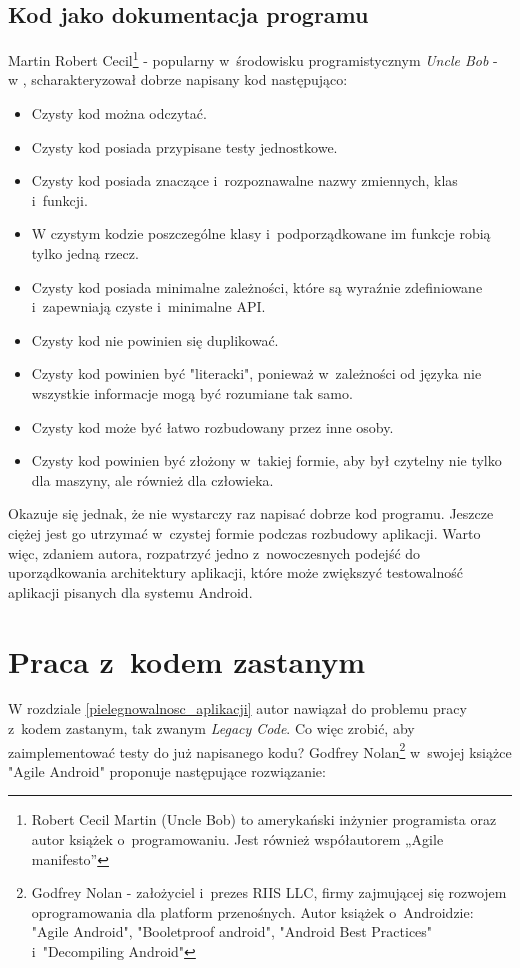 \subsection{Kod jako dokumentacja programu}
\label{czysty_kod}
Martin Robert Cecil\footnote{Robert Cecil Martin (Uncle Bob) to amerykański inżynier programista oraz autor książek o~programowaniu. Jest również współautorem „Agile manifesto”} - popularny w~środowisku programistycznym \textit{Uncle Bob} - w \cite{bib:cecil:clean_code}, scharakteryzował dobrze napisany kod następująco: 
\begin{itemize}
\item
Czysty kod można odczytać.
\item
Czysty kod posiada przypisane testy jednostkowe.
\item
Czysty kod posiada znaczące i~rozpoznawalne nazwy zmiennych, klas i~funkcji.
\item
W czystym kodzie poszczególne klasy i~podporządkowane im funkcje robią tylko jedną rzecz.
\item
Czysty kod posiada minimalne zależności, które są wyraźnie zdefiniowane i~zapewniają czyste i~minimalne API.
\item
Czysty kod nie powinien się duplikować.
\item
Czysty kod powinien być "literacki", ponieważ w~zależności od języka nie wszystkie informacje mogą być rozumiane tak samo.
\item
Czysty kod może być łatwo rozbudowany przez inne osoby.
\item
Czysty kod powinien być złożony w~takiej formie, aby był czytelny nie tylko dla maszyny, ale również dla człowieka.
\end{itemize}
Okazuje się jednak, że nie wystarczy raz napisać dobrze kod programu. Jeszcze ciężej jest go utrzymać w~czystej formie podczas rozbudowy aplikacji. Warto więc, zdaniem autora, rozpatrzyć jedno z~nowoczesnych podejść do uporządkowania architektury aplikacji, które może zwiększyć testowalność aplikacji pisanych dla systemu Android.

\section{Praca z~kodem zastanym}
\label{legacy_code}
W rozdziale \ref{pielegnowalnosc_aplikacji} autor nawiązał do problemu pracy z~kodem zastanym, tak zwanym \textit{Legacy Code}.
Co więc zrobić, aby zaimplementować testy do już napisanego kodu? Godfrey Nolan\footnote{Godfrey Nolan - założyciel i~prezes RIIS LLC, firmy zajmującej się rozwojem oprogramowania dla platform przenośnych. Autor książek o~Androidzie: "Agile Android", "Booletproof android", "Android Best Practices" i~"Decompiling Android"} w~swojej książce "Agile Android"\cite{bib:agile:android} proponuje następujące rozwiązanie:

